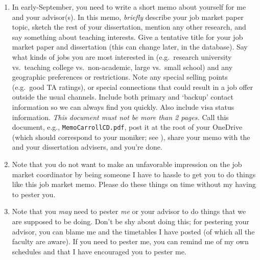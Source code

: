 \documentclass{\classes/econtex}
\begin{document}
\begin{enumerate}
  \hypertarget{write-and-post-memo}{}
\item {} In early-September, you need to write a short memo about yourself for me and your advisor(s).  In this memo, \textit{briefly} describe your job market paper topic, sketch the rest of your dissertation, mention any other research, and say something about teaching interests.  Give a tentative title for your job market paper and dissertation (this can change later, in the database).  Say what kinds of jobs you are most interested in (e.g.\ research university vs.\ teaching college vs.\ non-academic, large vs.\ small school) and any geographic preferences or restrictions.  Note any special selling points (e.g.\ good TA ratings), or special connections that could result in a job offer outside the usual channels.  Include both primary and `backup' contact information so we can always find you quickly.  Also include visa status information.  \textit{This document must not be more than 2 pages.}  Call this document, e.g., \texttt{MemoCarrollCD.pdf}, post it at the root of your OneDrive (which should correspond to your moniker; see \ntn), share your memo with the \JMPO and your dissertation advisers, and you're done.

\item Note that you do not want to make an unfavorable impression on
  the job market coordinator by being someone I have to hassle to get
  you to do things like this job market memo.  Please do these things
  on time without my having to pester you.

  \hypertarget{Pester}{}
\item Note that you \textit{may} need to pester \textit{me} or your advisor to do things
  that we are supposed to be doing.  Don't be shy about doing this; for pestering
  your advisor, you can blame me and the timetables I have posted (of which all the
  faculty are aware).  If you need to pester me, you can remind me of my own
  schedules and that I have encouraged you to pester me.


\end{enumerate}
\end{document}
